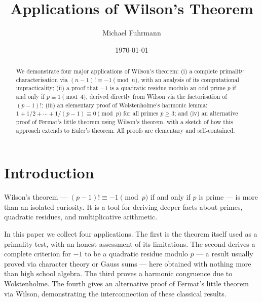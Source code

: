 \documentclass[12pt,a4paper]{amsart}
\theoremstyle{definition}
\begin{document}

\title{Applications of Wilson's Theorem}

\author{Michael Fuhrmann}
\address{Specialist Mathematics Project, Build 66}
\date{\today}

\begin{abstract}
We demonstrate four major applications of Wilson's theorem:
(i) a complete primality characterisation via $(n-1)! \equiv -1 \pmod n$,
with an analysis of its computational impracticality;
(ii) a proof that $-1$ is a quadratic residue modulo an odd prime $p$
if and only if $p \equiv 1 \pmod 4$, derived directly from Wilson via
the factorisation of $(p-1)!$;
(iii) an elementary proof of Wolstenholme's harmonic lemma:
$1 + 1/2 + \cdots + 1/(p-1) \equiv 0 \pmod p$ for all primes $p \geq 3$;
and (iv) an alternative proof of Fermat's little theorem using Wilson's theorem,
with a sketch of how this approach extends to Euler's theorem.
All proofs are elementary and self-contained.
\end{abstract}

\maketitle
\tableofcontents

\section{Introduction}

Wilson's theorem — $(p-1)! \equiv -1 \pmod p$ if and only if $p$ is prime —
is more than an isolated curiosity.  It is a tool for deriving deeper facts
about primes, quadratic residues, and multiplicative arithmetic.

In this paper we collect four applications.  The first is the theorem itself
used as a primality test, with an honest assessment of its limitations.
The second derives a complete criterion for $-1$ to be a quadratic residue
modulo $p$ — a result usually proved via character theory or Gauss sums — here
obtained with nothing more than high school algebra.  The third proves a
harmonic congruence due to Wolstenholme.  The fourth gives an alternative
proof of Fermat's little theorem via Wilson, demonstrating the interconnection
of these classical results.
\end{document}
